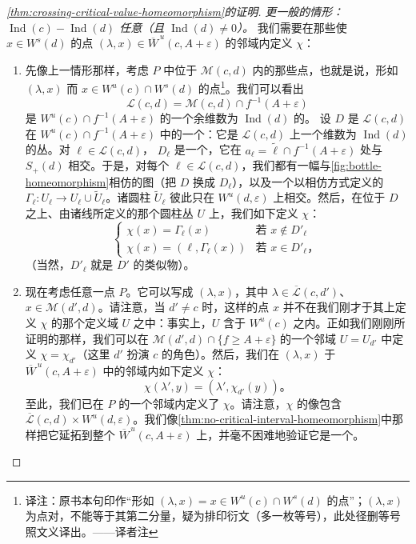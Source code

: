 \begin{proof}[\cref{thm:crossing-critical-value-homeomorphism}的证明]
\emph{更一般的情形：$\operatorname{Ind}(c)-\operatorname{Ind}(d)$ 任意（且 $\operatorname{Ind}(d)\neq 0$）。}
我们需要在那些使 $x\in W^s(d)$ 的点 $(\lambda,x)\in\overline{W}^{\,u}(c,A+\varepsilon)$ 的邻域内定义 $\chi$：
\begin{enumerate}[label=(\alph*)]
\item 先像上一情形那样，考虑 $P$ 中位于 $\mathcal{M}(c,d)$ 内的那些点，也就是说，形如 $(\lambda,x)$ 而 $x\in W^u(c)\cap W^s(d)$ 的点\footnote{译注：原书本句印作“形如 $(\lambda,x)=x\in W^{u}(c)\cap W^{s}(d)$ 的点”；$(\lambda,x)$ 为点对，不能等于其第二分量，疑为排印衍文（多一枚等号），此处径删等号照文义译出。——译者注}。我们可以看出
\[
\mathcal{L}(c,d)=\mathcal{M}(c,d)\cap f^{-1}(A+\varepsilon)
\]
是 $W^u(c)\cap f^{-1}(A+\varepsilon)$ 的一个余维数为 $\operatorname{Ind}(d)$ 的\trSubmanifold。
设 $D$ 是 $\mathcal{L}(c,d)$ 在 $W^u(c)\cap f^{-1}(A+\varepsilon)$ 中的一个\trTubularNeighborhood：它是 $\mathcal{L}(c,d)$ 上一个维数为 $\operatorname{Ind}(d)$ 的\trDisk{}丛。对 $\ell\in\mathcal{L}(c,d)$，\trFiber{} $D_\ell$ 是一个\trDisk，它在 $a_\ell=\tilde{\ell}\cap f^{-1}(A+\varepsilon)$ 处与 $S_+(d)$ \trTransverse{}相交。于是，对每个 $\ell\in\mathcal{L}(c,d)$，我们都有一幅与\cref{fig:bottle-homeomorphism}相仿的图（把 $D$ 换成 $D_\ell$），以及一个以相仿方式定义的\trHomeomorphism{} $\varGamma_\ell:U_\ell\to U_\ell\cup\widetilde{U}_\ell$。诸圆柱 $\widetilde{U}_\ell$ 彼此只在 $W^u(d,\varepsilon)$ 上相交。然后，在位于 $D$ 之上、由诸\trGradient{}线所定义的那个圆柱丛 $U$ 上，我们如下定义 $\chi$：
\[
\begin{cases}
\chi(x)=\varGamma_\ell(x) & \text{若 } x\notin D'_\ell\\
\chi(x)=(\ell,\varGamma_\ell(x)) & \text{若 } x\in D'_\ell\text{，}
\end{cases}
\]
（当然，$D'_\ell$ 就是 $D'$ 的类似物）。
\item 现在考虑任意一点 $P$。它可以写成 $(\lambda,x)$，其中 $\lambda\in\overline{\mathcal{L}}(c,d')$、$x\in\mathcal{M}(d',d)$。请注意，当 $d'\neq c$ 时，这样的点 $x$ 并不在我们刚才于其上定义 $\chi$ 的那个定义域 $U$ 之中：事实上，$U$ 含于 $W^u(c)$ 之内。正如我们刚刚所证明的那样，我们可以在 $\mathcal{M}(d',d)\cap\{f\ge A+\varepsilon\}$ 的一个邻域 $U=U_{d'}$ 中定义 $\chi=\chi_{d'}$（这里 $d'$ 扮演 $c$ 的角色）。然后，我们在 $(\lambda,x)$ 于 $\overline{W}^{\,u}(c,A+\varepsilon)$ 中的邻域内如下定义 $\chi$：
\[
\chi(\lambda',y)=(\lambda',\chi_{d'}(y))\text{。}
\]
至此，我们已在 $P$ 的一个\trOpen{}邻域内定义了 $\chi$。请注意，$\chi$ 的像包含 $\overline{\mathcal{L}}(c,d)\times W^u(d,\varepsilon)$。我们像\cref{thm:no-critical-interval-homeomorphism}中那样把它延拓到整个 $\overline{W}^{\,u}(c,A+\varepsilon)$ 上，并毫不困难地验证它是一个\trHomeomorphism。
\end{enumerate}


\end{proof}
